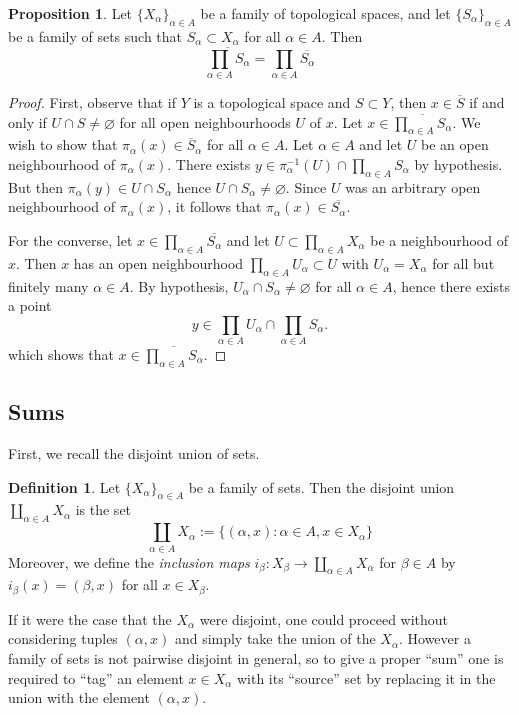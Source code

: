 \documentclass{book}
\theoremstyle{definition}
\newtheorem{proposition}{Proposition}[section]
\newtheorem{definition}{Definition}[section]
\theoremstyle{remark}
\begin{document}
\begin{proposition}
\label{closureproduct}
Let $\{X_\alpha\}_{\alpha\in A}$ be a family of topological spaces, and let $\{S_\alpha\}_{\alpha\in A}$ be a family of sets such that $S_\alpha\subset X_\alpha$ for all $\alpha\in A$. Then
$$\overline{\prod_{\alpha\in A} S_\alpha}=\prod_{\alpha\in A}\overline {S_\alpha}$$
\end{proposition}
\begin{proof}
First, observe that if $Y$ is a topological space and $S\subset Y$, then $x\in\overline S$ if and only if $U\cap S\neq \varnothing$ for all open neighbourhoods $U$ of $x$. Let $x\in\overline{\prod_{\alpha\in A}S_\alpha}$. We wish to show that $\pi_\alpha(x)\in \overline S_\alpha$ for all $\alpha\in A$. Let $\alpha\in A$ and let $U$ be an open neighbourhood of $\pi_\alpha(x)$. There exists $y\in \pi^{-1}_\alpha(U)\cap \prod_{\alpha\in A}S_\alpha$ by hypothesis. But then $\pi_\alpha(y)\in U\cap S_\alpha$ hence $U\cap S_\alpha\neq\varnothing$. Since $U$ was an arbitrary open neighbourhood of $\pi_\alpha(x)$, it follows that $\pi_\alpha(x)\in \overline {S_\alpha}$.

For the converse, let $x\in\prod_{\alpha\in A}\overline {S_\alpha}$ and let $U\subset\prod_{\alpha\in A} X_\alpha$ be a neighbourhood of $x$. Then $x$ has an open neighbourhood $\prod_{\alpha\in A}U_\alpha\subset U$ with $U_\alpha=X_\alpha$ for all but finitely many $\alpha\in A$. By hypothesis, $U_\alpha\cap S_\alpha\neq\varnothing$ for all $\alpha\in A$, hence there exists a point $$y\in\prod_{\alpha\in A}U_\alpha\cap\prod_{\alpha\in A}S_\alpha.$$
which shows that $x\in\overline{\prod_{\alpha\in A}S_\alpha}.$
\end{proof}

\subsection{Sums}
First, we recall the disjoint union of sets.

\begin{definition}
Let $\{X_\alpha\}_{\alpha\in A}$ be a family of sets. Then the disjoint union $\coprod_{\alpha\in A}X_\alpha$ is the set
$$\coprod_{\alpha\in A}X_\alpha:=\{(\alpha, x):\alpha\in A, x\in X_\alpha\}$$
Moreover, we define the \textit{inclusion maps} $i_\beta:X_\beta\to\coprod_{\alpha\in A}X_\alpha$ for $\beta\in A$ by $i_\beta(x)=(\beta,x)$ for all $x\in X_\beta$.
\end{definition}

If it were the case that the $X_\alpha$ were disjoint, one could proceed without considering tuples $(\alpha, x)$ and simply take the union of the $X_\alpha$. However a family of sets is not pairwise disjoint in general, so to give a proper ``sum'' one is required to ``tag'' an element $x\in X_\alpha$ with its ``source'' set by replacing it in the union with the element $(\alpha, x)$.
\end{document}
